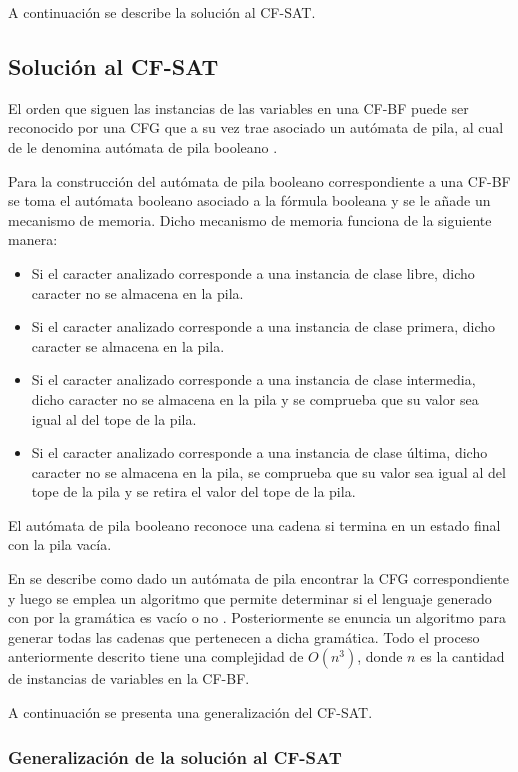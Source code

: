 A continuación se describe la solución al CF-SAT.

\subsection{Solución al CF-SAT}

El orden que siguen las instancias de las variables en una CF-BF puede ser reconocido por una CFG que a su vez trae asociado
un autómata de pila, al cual de le denomina autómata de pila booleano \cite{aCFSAT}.

Para la construcción del autómata de pila booleano correspondiente a una CF-BF se toma el autómata booleano asociado
a la fórmula booleana y se le añade un mecanismo de memoria. Dicho mecanismo de memoria funciona de la siguiente manera:

\begin{itemize}
      \item Si el caracter analizado corresponde a una instancia de clase libre, dicho caracter no se almacena en la pila.
      \item Si el caracter analizado corresponde a una instancia de clase primera, dicho caracter se almacena en la pila.
      \item Si el caracter analizado corresponde a una instancia de clase intermedia, dicho caracter no se almacena en la
            pila y se comprueba que su valor sea igual al del tope de la pila.
      \item Si el caracter analizado corresponde a una instancia de clase última, dicho caracter no se almacena en la
            pila, se comprueba que su valor sea igual al del tope de la pila y se retira el valor del tope de la pila.
\end{itemize}
El autómata de pila booleano reconoce una cadena si termina en un estado final con la pila vacía.

En \cite{aCFSAT} se describe como dado un autómata de pila encontrar la CFG correspondiente y luego
se emplea un algoritmo que permite determinar si el lenguaje generado con por la gramática es vacío o no \cite{authomataTheory}. Posteriormente
se enuncia un algoritmo para generar todas las cadenas que pertenecen a dicha gramática. Todo el proceso anteriormente descrito tiene una complejidad de $O(n^3)$, donde $n$
es la cantidad de instancias de variables en la CF-BF.

A continuación se presenta una generalización del CF-SAT.

\subsubsection{Generalización de la solución al CF-SAT}

